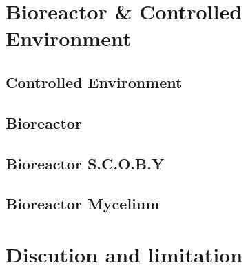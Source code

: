 \section{Bioreactor \& Controlled Environment }

\subsection{Controlled Environment} 



















\subsection{Bioreactor}
\subsection{Bioreactor S.C.O.B.Y}
\subsection{Bioreactor Mycelium}



\section{Discution and limitation}